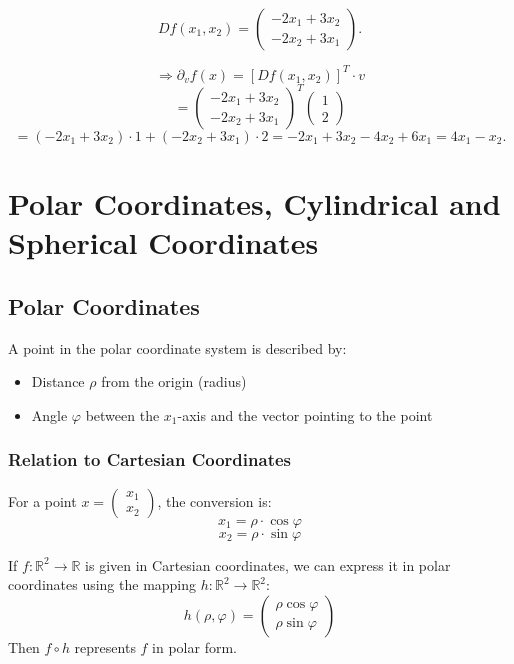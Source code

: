 \documentclass{article}
\begin{document}
\[
Df(x_1, x_2) = 
\begin{pmatrix}
-2x_1 + 3x_2 \\
-2x_2 + 3x_1
\end{pmatrix}.
\]

\[
\Rightarrow \partial_v f(x) = [Df(x_1, x_2)]^T \cdot v
\]
\[
= 
\begin{pmatrix}
-2x_1 + 3x_2 \\
-2x_2 + 3x_1
\end{pmatrix}^T 
\begin{pmatrix}
1 \\
2
\end{pmatrix}
\]
\[
= (-2x_1 + 3x_2) \cdot 1 + (-2x_2 + 3x_1) \cdot 2 = -2x_1 + 3x_2 - 4x_2 + 6x_1 = 4x_1 - x_2.
\]
\newpage
\section{Polar Coordinates, Cylindrical and Spherical Coordinates}

\subsection{Polar Coordinates}
A point in the polar coordinate system is described by:
\begin{itemize}
    \item Distance $\rho$ from the origin (radius)
    \item Angle $\varphi$ between the $x_1$-axis and the vector pointing to the point
\end{itemize}

\subsubsection{Relation to Cartesian Coordinates}
For a point $x = \begin{pmatrix} x_1 \\ x_2 \end{pmatrix}$, the conversion is:
\[
x_1 = \rho \cdot \cos\varphi
\]
\[
x_2 = \rho \cdot \sin\varphi
\]

If $f: \mathbb{R}^2 \to \mathbb{R}$ is given in Cartesian coordinates, we can express it in polar coordinates using the mapping $h:\mathbb{R}^2 \to \mathbb{R}^2$:
\[
h(\rho, \varphi) = 
\begin{pmatrix}
\rho \cos \varphi \\
\rho \sin \varphi
\end{pmatrix} 
\]
Then $f \circ h$ represents $f$ in polar form.
\end{document}
